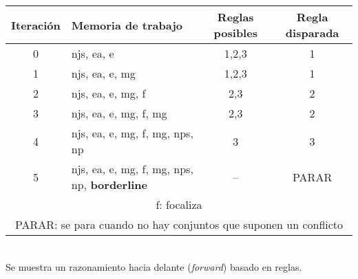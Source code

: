 \documentclass[letterpaper,12pt]{article}
\begin{document}
\begin{tabular}{|c|p{5.5cm}|c|c|}
\hline 
Iteración & Memoria de trabajo & Reglas posibles & Regla disparada \\ 
\hline 
0 & njs, ea, e & 1,2,3 & 1 \\ 
\hline 
1 & njs, ea, e, mg & 1,2,3 & 1 \\ 
\hline 
2 & njs, ea, e, mg, f & 2,3 & 2 \\ 
\hline 
3 & njs, ea, e, mg, f, mg & 2,3 & 2 \\ 
\hline 
4 & njs, ea, e, mg, f, mg, nps, np & 3 & 3 \\ 
\hline 
5 & njs, ea, e, mg, f, mg, nps, np, \textbf{borderline} & -- & PARAR \\ 
\hline 
\multicolumn{4}{|p{13.3cm}|}{f: focaliza} \\ 
\multicolumn{4}{|p{13.3cm}|}{PARAR: se para cuando no hay conjuntos que suponen un conflicto} \\ 
\hline 
\end{tabular} \\
Se muestra un razonamiento hacia delante (\textit{forward}) basado en reglas.
\end{document}
